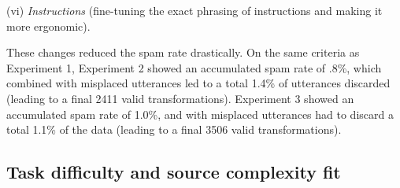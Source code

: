 \documentclass[a4paper,fleqn]{cas-dc}
\begin{document}
(vi)  \emph{Instructions} (fine-tuning the exact phrasing of instructions and making it more ergonomic).

These changes reduced the spam rate drastically. On the same criteria as
Experiment 1, Experiment 2 showed an accumulated spam rate of .8\%,
which combined with misplaced utterances led to a total 1.4\% of
utterances discarded (leading to a final 2411 valid transformations).
Experiment 3 showed an accumulated spam rate of 1.0\%, and with
misplaced utterances had to discard a total 1.1\% of the data (leading
to a final 3506 valid transformations).

%
\subsection{Task difficulty and source complexity
fit}\label{task-difficulty-and-source-complexity-fit}
\end{document}
